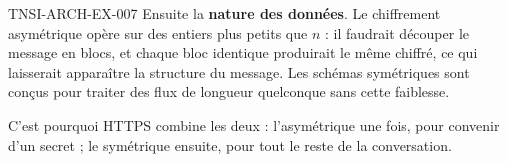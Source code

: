 \begin{corrige}{TNSI-ARCH-EX-007}
Ensuite la \textbf{nature des données}. Le chiffrement asymétrique opère sur des
entiers plus petits que $n$ : il faudrait découper le message en blocs, et chaque
bloc identique produirait le même chiffré, ce qui laisserait apparaître la
structure du message. Les schémas symétriques sont conçus pour traiter des flux
de longueur quelconque sans cette faiblesse.

C'est pourquoi HTTPS combine les deux : l'asymétrique une fois, pour convenir
d'un secret ; le symétrique ensuite, pour tout le reste de la conversation.
\end{corrige}
